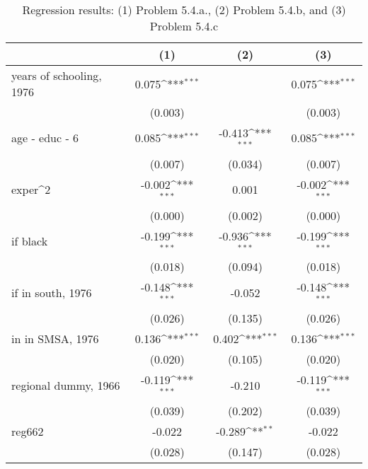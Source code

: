 \begin{table}[htbp]\centering
\def\sym#1{\ifmmode^{#1}\else\(^{#1}\)\fi}
\caption{Regression results: (1) Problem 5.4.a., (2) Problem 5.4.b, and (3) Problem 5.4.c}
\begin{tabular}{l*{3}{c}}
\toprule
                    &\multicolumn{1}{c}{(1)}         &\multicolumn{1}{c}{(2)}         &\multicolumn{1}{c}{(3)}         \\
\midrule
years of schooling, 1976&       0.075\sym{***}&                     &       0.075\sym{***}\\
                    &     (0.003)         &                     &     (0.003)         \\
\addlinespace
age - educ - 6      &       0.085\sym{***}&      -0.413\sym{***}&       0.085\sym{***}\\
                    &     (0.007)         &     (0.034)         &     (0.007)         \\
\addlinespace
exper^2             &      -0.002\sym{***}&       0.001         &      -0.002\sym{***}\\
                    &     (0.000)         &     (0.002)         &     (0.000)         \\
\addlinespace
=1 if black         &      -0.199\sym{***}&      -0.936\sym{***}&      -0.199\sym{***}\\
                    &     (0.018)         &     (0.094)         &     (0.018)         \\
\addlinespace
=1 if in south, 1976&      -0.148\sym{***}&      -0.052         &      -0.148\sym{***}\\
                    &     (0.026)         &     (0.135)         &     (0.026)         \\
\addlinespace
=1 in in SMSA, 1976 &       0.136\sym{***}&       0.402\sym{***}&       0.136\sym{***}\\
                    &     (0.020)         &     (0.105)         &     (0.020)         \\
\addlinespace
regional dummy, 1966&      -0.119\sym{***}&      -0.210         &      -0.119\sym{***}\\
                    &     (0.039)         &     (0.202)         &     (0.039)         \\
\addlinespace
reg662              &      -0.022         &      -0.289\sym{**} &      -0.022         \\
                    &     (0.028)         &     (0.147)         &     (0.028)         \\

\end{tabular}
\end{table}
